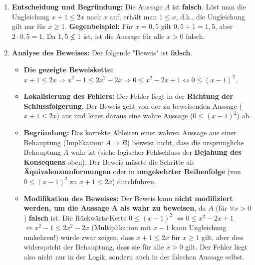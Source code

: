 \documentclass{article}
\begin{document}
\begin{enumerate}[label=(\alph*)]
    \item \textbf{Entscheidung und Begründung:}
    Die Aussage $A$ ist \textbf{falsch}.
    Löst man die Ungleichung $x+1 \leq 2x$ nach $x$ auf, erhält man $1 \leq x$, d.h., die Ungleichung gilt nur für $x \geq 1$.
    \textbf{Gegenbeispiel:} Für $x = 0,5$ gilt $0,5 + 1 = 1,5$, aber $2 \cdot 0,5 = 1$. Da $1,5 \not\leq 1$ ist, ist die Aussage für alle $x > 0$ falsch.

    \item \textbf{Analyse des Beweises:}
    Der folgende "Beweis" ist \textbf{falsch}.
    \begin{itemize}
        \item \textbf{Die gezeigte Beweiskette:} $x+1 \leq 2x \Rightarrow x^2 - 1 \leq 2x^2 - 2x \Rightarrow 0 \leq x^2 - 2x + 1 \iff 0 \leq (x-1)^2$.
        \item \textbf{Lokalisierung des Fehlers:} Der Fehler liegt in der \textbf{Richtung der Schlussfolgerung}. Der Beweis geht von der zu beweisenden Aussage ($x+1 \leq 2x$) aus und leitet daraus eine wahre Aussage ($0 \leq (x-1)^2$) ab.
        \item \textbf{Begründung:} Das korrekte Ableiten einer wahren Aussage aus einer Behauptung (Implikation: $A \Rightarrow B$) beweist nicht, dass die ursprüngliche Behauptung $A$ wahr ist (siehe logischer Fehlschluss der \textbf{Bejahung des Konsequens} oben). Der Beweis müsste die Schritte als \textbf{Äquivalenzumformungen} oder in \textbf{umgekehrter Reihenfolge} (von $0 \leq (x-1)^2$ zu $x+1 \leq 2x$) durchführen.
        \item \textbf{Modifikation des Beweises:} Der Beweis kann \textbf{nicht modifiziert werden, um die Aussage A als wahr zu beweisen}, da $A$ (für $\forall x > 0$) \textbf{falsch} ist. Die Rückwärts-Kette
        $0 \leq (x-1)^2$
        $\iff 0 \leq x^2 - 2x + 1$
        $\iff x^2 - 1 \leq 2x^2 - 2x$ (Multiplikation mit $x-1$ kann Ungleichung umkehren!)
        würde zwar zeigen, dass $x+1 \leq 2x$ für $x \geq 1$ gilt, aber dies widerspricht der Behauptung, dass sie für alle $x>0$ gilt. Der Fehler liegt also nicht nur in der Logik, sondern auch in der falschen Aussage selbst.
    \end{itemize}
\end{enumerate}
\end{document}
